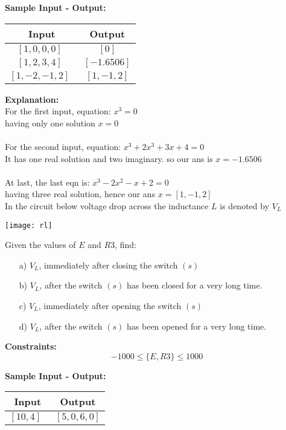 \documentclass[12pt,paper=a4,answers]{exam}
\begin{document}
\begin{questions}
\textbf{ Sample Input - Output:}
\begin{center}
\begin{tabular}{|c|c|}
\hline
\textbf{Input} & \textbf{Output}\\
\hline
$[1, 0, 0, 0]\ \ $ & $[0]$ \\
$[1, 2, 3, 4]\ \ $ & $[-1.6506]$ \\
$[1, -2, -1, 2] \ \ $ & $[1, -1, 2]$ \\
\hline
\end{tabular}
\end{center}

\textbf{Explanation:} \\
For the first input, equation: $ x^3 = 0$ \\
having only one solution $x = 0$ \\
\\
For the second input, equation: $x^3 + 2x^3 + 3x + 4 = 0$\\
It has one real solution and two imaginary. so our ans is $x = -1.6506$\\
\\
At last, the last eqn is: $x^3 - 2x^2 - x + 2 = 0$\\
having three real solution, hence our ans $x = [1, -1, 2]$ 
\\

\droppoints
\question[10]
\label{Q:zbus}
In the circuit below voltage drop across the inductance $L$ is denoted by $V_L$\\
\begin{center}
\texttt{[image: rl]}
\end{center}
\newpage
Given the values of $E$ and $R3$, find:
\begin{enumerate}
\item[a)] $V_L$, immediately after closing the switch $(s)$
\item[b)] $V_L$, after the switch $(s)$ has been closed for a very long time.
\item[c)] $V_L$, immediately after opening the switch $(s)$
\item[d)] $V_L$, after the switch $(s)$ has been opened for a very long time. 
\end{enumerate} 
\textbf{ Constraints:} 
$$ -1000 \leq \{ E, R3 \} \leq 1000$$

\textbf{ Sample Input - Output:}\\
\begin{center}
\begin{tabular}{|c|c|}
\hline
\textbf{Input} & \textbf{Output}\\
\hline
$[10, 4]\ \ $ & $[5, 0, 6, 0]$ \\
\hline
\end{tabular}
\end{center}


\end{questions}
\end{document}
